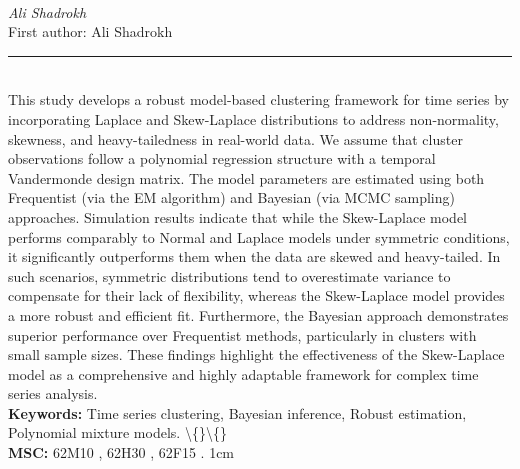 \documentclass[10pt,twoside]{article}
\begin{document}
\noindent\begin{minipage}[t][\textheight]{\textwidth}
\\[0.35em]
{\itshape Ali Shadrokh}\\[0.2em]
{\footnotesize First author: Ali Shadrokh}\\[0.45em]
\noindent\rule{\textwidth}{0.3pt}\\[0.4em]
{\footnotesize  This study develops a robust model-based clustering framework for time series by incorporating Laplace and Skew-Laplace distributions to address non-normality, skewness, and heavy-tailedness in real-world data. We assume that cluster observations follow a polynomial regression structure with a temporal Vandermonde design matrix. The model parameters are estimated using both Frequentist (via the EM algorithm) and Bayesian (via MCMC sampling) approaches. Simulation results indicate that while the Skew-Laplace model performs comparably to Normal and Laplace models under symmetric conditions, it significantly outperforms them when the data are skewed and heavy-tailed. In such scenarios, symmetric distributions tend to overestimate variance to compensate for their lack of flexibility, whereas the Skew-Laplace model provides a more robust and efficient fit. Furthermore, the Bayesian approach demonstrates superior performance over Frequentist methods, particularly in clusters with small sample sizes. These findings highlight the effectiveness of the Skew-Laplace model as a comprehensive and highly adaptable framework for complex time series analysis.}\\[0.4em]
{\footnotesize\bfseries Keywords:} {\footnotesize Time series clustering, Bayesian inference, Robust estimation, Polynomial mixture models. \textbackslash\{\}\textbackslash\{\}}\\[0.15em]
{\footnotesize\bfseries MSC:} {\footnotesize 62M10 , 62H30 , 62F15 . 1cm}\\
\vfill
\end{minipage}
\newpage
\end{document}
